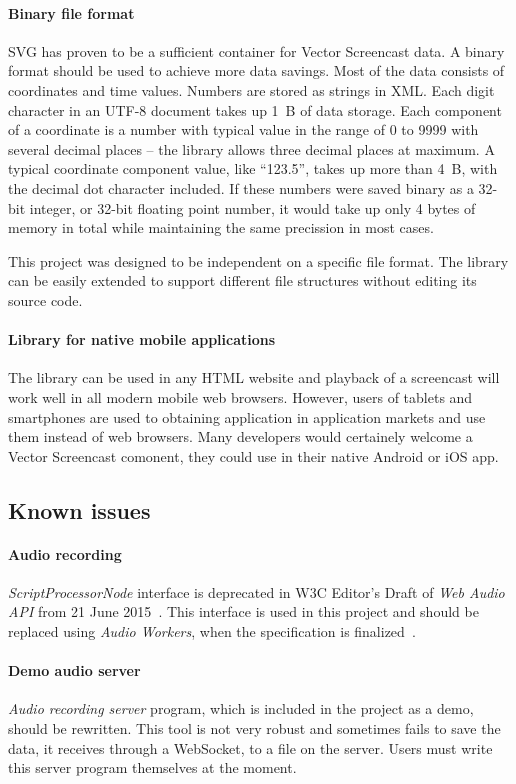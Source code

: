 \paragraph{Binary file format}
SVG has proven to be a sufficient container for Vector Screencast data. A binary format should be used to achieve more data savings. Most of the data consists of coordinates and time values. Numbers are stored as strings in XML. Each digit character in an UTF-8 document takes up 1~B of data storage. Each component of a coordinate is a number with typical value in the range of 0 to 9999 with several decimal places -- the library allows three decimal places at maximum. A typical coordinate component value, like ``123.5'', takes up more than 4~B, with the decimal dot character included. If these numbers were saved binary as a 32-bit integer, or 32-bit floating point number, it would take up only 4 bytes of memory in total while maintaining the same precission in most cases.

This project was designed to be independent on a specific file format. The library can be easily extended to support different file structures without editing its source code.

\paragraph{Library for native mobile applications}
The library can be used in any HTML website and playback of a screencast will work well in all modern mobile web browsers. However, users of tablets and smartphones are used to obtaining application in application markets and use them instead of web browsers. Many developers would certainely welcome a Vector Screencast comonent, they could use in their native Android or iOS app. 


\subsection*{Known issues}
\paragraph{Audio recording} \textit{ScriptProcessorNode} interface is deprecated in W3C Editor's Draft of \textit{Web Audio API} from 21 June 2015~\cite{mic_deprecated}. This interface is used in this project and should be replaced using \textit{Audio Workers}, when the specification is finalized~\cite{audio_worker}. 

\paragraph{Demo audio server} \textit{Audio recording server} program, which is included in the project as a demo, should be rewritten. This tool is not very robust and sometimes fails to save the data, it receives through a WebSocket, to a file on the server. Users must write this server program themselves at the moment.